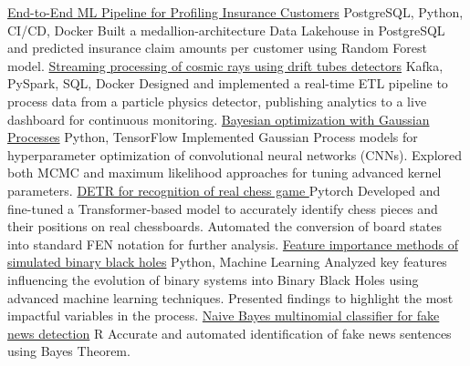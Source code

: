 \documentclass[9pt]{developercv} %
\begin{document}
\begin{entrylist}
    
    \entry
        {}
        {\href{https://github.com/XRD-Group/End-To-End-ML-pipeline-for-profiling-insurance-customers}{End-to-End ML Pipeline for Profiling Insurance Customers}}
        {PostgreSQL, Python, CI/CD, Docker}
        {Built a medallion-architecture Data Lakehouse in PostgreSQL and predicted insurance claim amounts per customer using Random Forest model.}
    \entry
		{}
		{\href{https://github.com/bhroben/Streaming-processing-of-cosmic-rays-using-drift-tubes-detectors}{Streaming processing of cosmic rays using drift tubes detectors}}
		{Kafka, PySpark, SQL, Docker}
		{Designed and implemented a real-time ETL pipeline to process data from a particle physics detector, publishing analytics to a live dashboard for continuous monitoring.}
    \entry
		{}
		{\href{https://github.com/bhroben/Bayesian-Optimization-with-Gaussian-Process}{Bayesian optimization with Gaussian Processes}}
		{Python, TensorFlow}
		{Implemented Gaussian Process models for hyperparameter optimization of convolutional neural networks (CNNs). Explored both MCMC and maximum likelihood approaches for tuning advanced kernel parameters.}
    \entry
        {}
        {\href{https://github.com/bhroben/DETR-for-recognition-of-real-chess-game}{DETR for recognition of real chess game }}
        {Pytorch}
        {
            Developed and fine-tuned a Transformer-based model to accurately identify chess pieces and their positions on real chessboards. Automated the conversion of board states into standard FEN notation for further analysis.}
    \entry
		{}
		{\href{https://github.com/bhroben/Feature-importance-methods-of-simulated-binary-black-holes}{Feature importance methods of simulated binary black holes}}
		{Python, Machine Learning}
        {Analyzed key features influencing the evolution of binary systems into Binary Black Holes using advanced machine learning techniques. Presented findings to highlight the most impactful variables in the process.}
	\entry
		{}
		{\href{https://github.com/bhroben/Naive-Bayes-multinomial-classifier-for-fake-news-detection}{Naive Bayes multinomial classifier for fake news detection}}
		{R}
		{%
        Accurate and automated identification of fake news sentences using Bayes Theorem.}


\end{entrylist}
\end{document}
